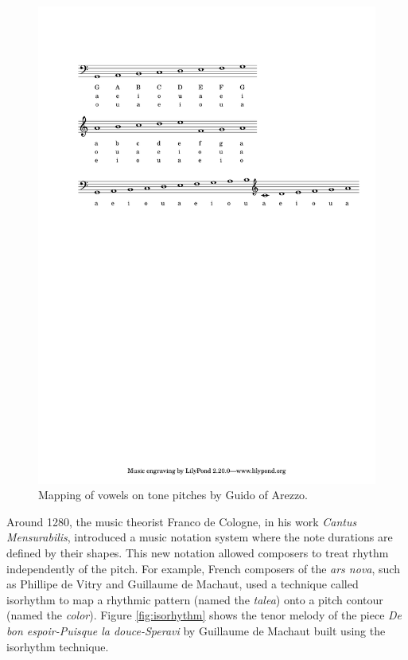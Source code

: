 \begin{figure}[!h]
 \centering
 \includegraphics[width=\columnwidth]{imgs/background/arezzo.pdf}
 \caption{Mapping of vowels on tone pitches by Guido of Arezzo.}
 \label{fig:arezzo}
\end{figure}

Around 1280, the music theorist Franco de Cologne, in his work \textit{Cantus Mensurabilis}, introduced a music notation system where the note durations are defined by their shapes. This new notation allowed
composers to treat rhythm independently of the pitch. For example, French composers of the \textit{ars nova}, such as Phillipe de Vitry and Guillaume de Machaut, used a technique called isorhythm to map a rhythmic pattern (named the \textit{talea}) onto a pitch contour (named the \textit{color}). Figure \ref{fig:isorhythm} shows the tenor melody of the piece \textit{De bon espoir-Puisque la douce-Speravi} by Guillaume de Machaut built using the isorhythm technique.

